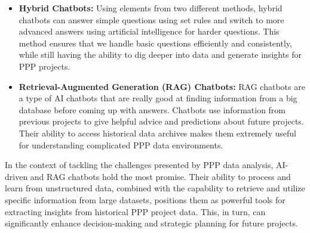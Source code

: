\begin{itemize}
\vskip 0.5cm
\item \textbf{Hybrid Chatbots:} Using elements from two different methods, hybrid chatbots can answer simple questions using set rules and switch to more advanced answers using artificial intelligence for harder questions. This method ensures that we handle basic questions efficiently and consistently, while still having the ability to dig deeper into data and generate insights for PPP projects.
\vskip 0.5cm

\item \textbf{Retrieval-Augmented Generation (RAG) Chatbots:} RAG chatbots are a type of AI chatbots that are really good at finding information from a big database before coming up with answers. Chatbots use information from previous projects to give helpful advice and predictions about future projects. Their ability to access historical data archives makes them extremely useful for understanding complicated PPP data environments.
\end{itemize}
\vskip 0.5cm
In the context of tackling the challenges presented by PPP data analysis, AI-driven and RAG chatbots hold the most promise. Their ability to process and learn from unstructured data, combined with the capability to retrieve and utilize specific information from large datasets, positions them as powerful tools for extracting insights from historical PPP project data. This, in turn, can significantly enhance decision-making and strategic planning for future projects.

